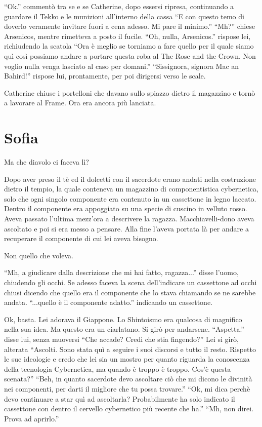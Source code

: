     ``Ok.'' commentò tra se e se Catherine, dopo essersi ripresa, continuando a guardare il Tekko e le munizioni
    all'interno della cassa ``E con questo temo di doverlo veramente invitare fuori a cena adesso. Mi pare il minimo.''
    ``Mh?'' chiese Arsenicos, mentre rimetteva a posto il fucile. ``Oh, nulla, Arsenicos.'' rispose lei, richiudendo la
    scatola ``Ora è meglio se torniamo a fare quello per il quale siamo quì così possiamo andare a portare questa roba
    al The Rose and the Crown. Non voglio nulla venga lasciato al caso per domani.'' ``Sissignora, signora Mac an
    Bahird!'' rispose lui, prontamente, per poi dirigersi verso le scale.

    Catherine chiuse i portelloni che davano sullo spiazzo dietro il magazzino e tornò a lavorare al Frame. Ora era
    ancora più lanciata.

  \section*{Sofia}

    Ma che diavolo ci faceva lì?

    Dopo aver preso il tè ed il dolcetti con il sacerdote erano andati nella costruzione dietro il tempio, la quale
    conteneva un magazzino di componentistica cybernetica, solo che ogni singolo componente era contenuto in un
    cassettone in legno laccato. Dentro il componente era appoggiato su una specie di cuscino in velluto rosso. Aveva
    passato l'ultima mezz'ora a descrivere la ragazza. Macchiavelli-dono aveva ascoltato e poi si era messo a pensare.
    Alla fine l'aveva portata là per andare a recuperare il componente di cui lei aveva bisogno.

    Non quello che voleva.

    ``Mh, a giudicare dalla descrizione che mi hai fatto, ragazza...'' disse l'uomo, chiudendo gli occhi. Se adesso
    faceva la scena dell'indicare un cassettone ad occhi chiusi dicendo che quello era il componente che lo stava
    chiamando se ne sarebbe andata. ``...quello è il componente adatto.'' indicando un cassettone.

    Ok, basta. Lei adorava il Giappone. Lo Shintoismo era qualcosa di magnifico nella sua idea. Ma questo era un
    ciarlatano. Si girò per andarsene. ``Aspetta.'' disse lui, senza muoversi ``Che accade? Credi che stia fingendo?''
    Lei si girò, alterata ``Ascolti. Sono stata quì a seguire i suoi discorsi e tutto il resto. Rispetto le sue
    ideologie e credo che lei sia un mostro per quanto riguarda la conoscenza della tecnologia Cybernetica, ma quando è
    troppo è troppo. Cos'è questa scenata?'' ``Beh, in quanto sacerdote devo ascoltare ciò che mi dicono le divinità
    nei componenti, per darti il migliore che tu possa trovare.'' ``Ok, mi dica perchè devo continuare a star quì ad
    ascoltarla? Probabilmente ha solo indicato il cassettone con dentro il cervello cybernetico più recente che ha.''
    ``Mh, non direi. Prova ad aprirlo.''

